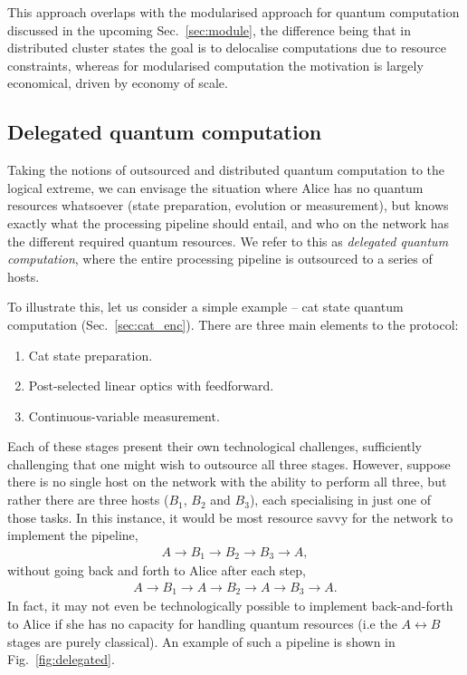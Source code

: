 This approach overlaps with the modularised approach for quantum computation discussed in the upcoming Sec.~\ref{sec:module}, the difference being that in distributed cluster states the goal is to delocalise computations due to resource constraints, whereas for modularised computation the motivation is largely economical, driven by economy of scale.

%
%

\subsection{Delegated quantum computation} 

Taking the notions of outsourced and distributed quantum computation to the logical extreme, we can envisage the situation where Alice has no quantum resources whatsoever (state preparation, evolution or measurement), but knows exactly what the processing pipeline should entail, and who on the network has the different required quantum resources. We refer to this as \textit{delegated quantum computation}, where the entire processing pipeline is outsourced to a series of hosts.

To illustrate this, let us consider a simple example -- cat state quantum computation (Sec.~\ref{sec:cat_enc}). There are three main elements to the protocol:
\begin{enumerate}
\item Cat state preparation.
\item Post-selected linear optics with feedforward.
\item Continuous-variable measurement.
\end{enumerate}

Each of these stages present their own technological challenges, sufficiently challenging that one might wish to outsource all three stages. However, suppose there is no single host on the network with the ability to perform all three, but rather there are three hosts ($B_1$, $B_2$ and $B_3$), each specialising in just one of those tasks. In this instance, it would be most resource savvy for the network to implement the pipeline,
\begin{align}
	A\to B_1\to B_2\to B_3\to A,
\end{align}
without going back and forth to Alice after each step,
\begin{align}
	A\to B_1\to A\to B_2 \to A\to B_3\to A.
\end{align}
In fact, it may not even be technologically possible to implement back-and-forth to Alice if she has no capacity for handling quantum resources (i.e the \mbox{$A\leftrightarrow B$} stages are purely classical). An example of such a pipeline is shown in Fig.~\ref{fig:delegated}.


